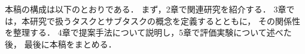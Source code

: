 \documentclass[submit,techreq]{ipsj}
\def\|{\verb|}
\begin{document}
本稿の構成は以下のとおりである．
まず，2章で関連研究を紹介する．
3章では，本研究で扱うタスクとサブタスクの概念を定義するとともに，
その関係性を整理する．
4章で提案手法について説明し，5章で評価実験について述べた後，
最後に本稿をまとめる．


%\begin{itemize}
%\item \|立体マスクをつける|


%
\end{document}

